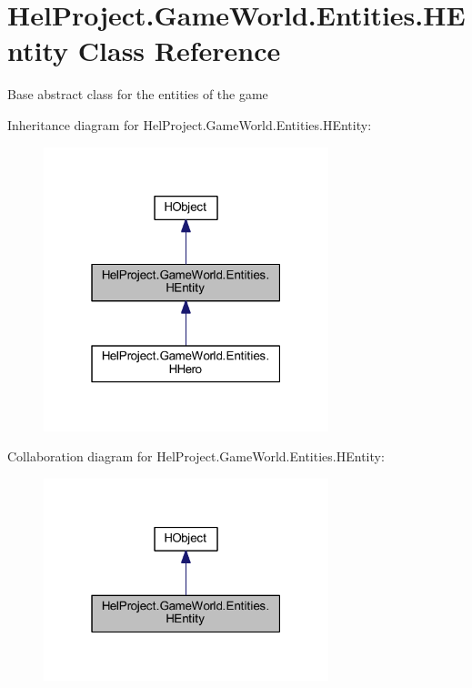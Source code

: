 \hypertarget{class_hel_project_1_1_game_world_1_1_entities_1_1_h_entity}{}\section{Hel\+Project.\+Game\+World.\+Entities.\+H\+Entity Class Reference}
\label{class_hel_project_1_1_game_world_1_1_entities_1_1_h_entity}


Base abstract class for the entities of the game  




Inheritance diagram for Hel\+Project.\+Game\+World.\+Entities.\+H\+Entity\+:
\nopagebreak
\begin{figure}[H]
\begin{center}
\leavevmode
\includegraphics[width=235pt]{class_hel_project_1_1_game_world_1_1_entities_1_1_h_entity__inherit__graph}
\end{center}
\end{figure}


Collaboration diagram for Hel\+Project.\+Game\+World.\+Entities.\+H\+Entity\+:\nopagebreak
\begin{figure}[H]
\begin{center}
\leavevmode
\includegraphics[width=235pt]{class_hel_project_1_1_game_world_1_1_entities_1_1_h_entity__coll__graph}
\end{center}
\end{figure}
